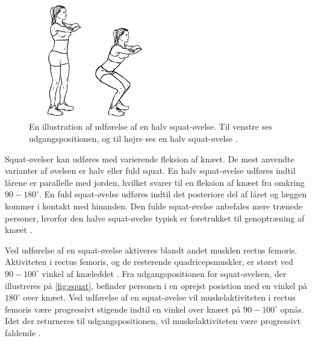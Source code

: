 \begin{figure}[H]
\centering
\includegraphics[width=0.5\textwidth]{figures/squat.png}
\caption{En illustration af udførelse af en halv squat-øvelse. Til venstre ses udgangspositionen, og til højre ses en halv squat-øvelse \citep{squat2015}.}
\label{fig:squat}
\end{figure}

\noindent 
Squat-øvelser kan udføres med varierende fleksion af knæet. De mest anvendte varianter af øvelsen er halv eller fuld squat. En halv squat-øvelse udføres indtil lårene er parallelle med jorden, hvilket svarer til en fleksion af knæet fra omkring $90-180^{\circ}$. En fuld squat-øvelse udføres indtil det posteriore del af låret og læggen kommer i kontakt med hinanden. Den fulde squat-øvelse anbefales mere trænede personer, hvorfor den halve squat-øvelse typisk er foretrukket til genoptræning af knæet \citep{escamilla2001}.

Ved udførelse af en squat-øvelse aktiveres blandt andet musklen rectus femoris. Aktiviteten i rectus femoris, og de resterende quadricepsmuskler, er størst ved $90-100^{\circ}$ vinkel af knæleddet \citep{schoenfeld2010}. 
Fra udgangspositionen for squat-øvelsen, der illustreres på \autoref{fig:squat}, befinder personen i en oprejst posistion med en vinkel på $180^{\circ}$ over knæet. Ved udførelse af en squat-øvelse vil muskelaktiviteten i rectus femoris være progressivt stigende indtil en vinkel over knæet på $90-100^{\circ}$ opnås. Idet der returneres til udgangspositionen, vil muskelaktiviteten være progressivt faldende \citep{escamilla2001}. 



